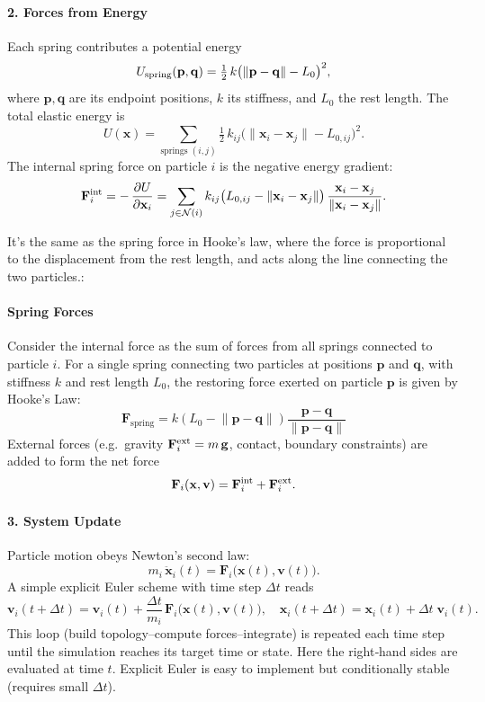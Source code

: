 \documentclass{article}
\begin{document}
\paragraph{2. Forces from Energy}  
Each spring contributes a potential energy
\[
  U_{\rm spring}(\mathbf{p},\mathbf{q})
  = \tfrac12\,k\bigl(\|\mathbf{p}-\mathbf{q}\| - L_0\bigr)^2,
\]
where \(\mathbf{p},\mathbf{q}\) are its endpoint positions, \(k\) its stiffness, and \(L_0\) the rest length.  
The total elastic energy is
\[
  U(\mathbf{x})
  = \sum_{\text{springs } (i,j)} \tfrac12\,k_{ij}\bigl(\|\mathbf{x}_i-\mathbf{x}_j\| - L_{0,ij}\bigr)^2.
\]
The internal spring force on particle \(i\) is the negative energy gradient:
\[
  \mathbf{F}_i^{\rm int}
  = -\,\frac{\partial U}{\partial \mathbf{x}_i}
  = \sum_{j\in\mathcal{N}(i)}
    k_{ij}\bigl(L_{0,ij}-\|\mathbf{x}_i-\mathbf{x}_j\|\bigr)\,
    \frac{\mathbf{x}_i-\mathbf{x}_j}{\|\mathbf{x}_i-\mathbf{x}_j\|}.
\]

It's the same as the spring force in Hooke's law, where the force is proportional to the displacement from the rest length, and acts along the line connecting the two particles.:
\paragraph{Spring Forces}
Consider the internal force as the sum of forces from all springs connected to particle $i$. For a single spring connecting two particles at positions $\mathbf{p}$ and $\mathbf{q}$, with stiffness $k$ and rest length $L_0$, the restoring force exerted on particle $\mathbf{p}$ is given by Hooke's Law:
\begin{equation} \label{eq:spring_force}
    \mathbf{F}_{\text{spring}} = k (L_0 - \lVert \mathbf{p} - \mathbf{q} \rVert) \frac{\mathbf{p} - \mathbf{q}}{\lVert \mathbf{p} - \mathbf{q} \rVert}
\end{equation}
\newline
External forces (e.g.\ gravity \(\mathbf{F}_i^{\rm ext}=m\,\mathbf{g}\), contact, boundary constraints) are added to form the net force
\[
  \mathbf{F}_i(\mathbf{x},\mathbf{v})
  = \mathbf{F}_i^{\rm int} + \mathbf{F}_i^{\rm ext}.
\]

\paragraph{3. System Update}  
Particle motion obeys Newton’s second law:
\begin{equation}
  m_i\,\ddot{\mathbf{x}}_i(t)
  = \mathbf{F}_i\bigl(\mathbf{x}(t),\mathbf{v}(t)\bigr).
\end{equation}
A simple explicit Euler scheme with time step \(\Delta t\) reads
\[
  \mathbf{v}_i(t+\Delta t)
    = \mathbf{v}_i(t)
    + \frac{\Delta t}{m_i}\,\mathbf{F}_i\bigl(\mathbf{x}(t),\mathbf{v}(t)\bigr),
  \quad
  \mathbf{x}_i(t+\Delta t)
    = \mathbf{x}_i(t) + \Delta t\;\mathbf{v}_i(t).
\]
This loop (build topology–compute forces–integrate) is repeated each time step until the simulation reaches its target time or state.
Here the right‐hand sides are evaluated at time \(t\). Explicit Euler is easy to implement but conditionally stable (requires small \(\Delta t\)).
\end{document}
